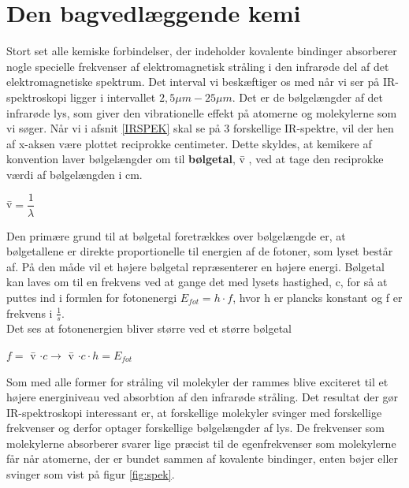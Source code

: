 \section{Den bagvedlæggende kemi}
Stort set alle kemiske forbindelser, der indeholder kovalente bindinger absorberer nogle specielle frekvenser af elektromagnetisk stråling i den infrarøde del af det elektromagnetiske spektrum. Det interval vi beskæftiger os med når vi ser på IR-spektroskopi ligger i intervallet $2,5 \mu m- 25 \mu m $. Det er de bølgelængder af det infrarøde lys, som giver den vibrationelle effekt på atomerne og molekylerne som vi søger. Når vi i afsnit \ref{IRSPEK} skal se på 3 forskellige IR-spektre, vil der hen af x-aksen være plottet reciprokke centimeter. Dette skyldes, at kemikere af konvention laver bølgelængder om til \textbf{bølgetal}, \={v} , ved at tage den reciprokke værdi af bølgelængden i cm.

\begin{center}
\={v}$= \dfrac{1}{\lambda}$
\end{center}

Den primære grund til at bølgetal foretrækkes over bølgelængde er, at bølgetallene er direkte proportionelle til energien af de fotoner, som lyset består af. På den måde vil et højere bølgetal repræsenterer en højere energi. Bølgetal kan laves om til en frekvens ved at gange det med lysets hastighed, c, for så at puttes ind i formlen for fotonenergi $E_{fot} = h \cdot f$, hvor h er plancks konstant og f er frekvens i $\frac{1}{s}$. 
\\

Det ses at fotonenergien bliver større ved et større bølgetal 
\\

\begin{center}
$f =$ \={v} $\cdot c \rightarrow$ \={v} $\cdot c \cdot h = E_{fot}$
\end{center}

Som med alle former for stråling vil molekyler der rammes blive exciteret til et højere energiniveau ved absorbtion af den infrarøde stråling. Det resultat der gør IR-spektroskopi interessant er, at  forskellige molekyler svinger med forskellige frekvenser og derfor optager forskellige bølgelængder af lys. De frekvenser som molekylerne absorberer svarer lige præcist til de egenfrekvenser som molekylerne får når atomerne, der er bundet sammen af kovalente bindinger, enten bøjer eller svinger som vist på figur \ref{fig:spek}. 
\\

